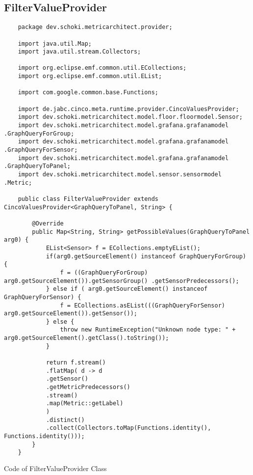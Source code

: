 \subsection{FilterValueProvider}
\begin{longlisting}
	\begin{verbatim}
	package dev.schoki.metricarchitect.provider;
	
	import java.util.Map;
	import java.util.stream.Collectors;
	
	import org.eclipse.emf.common.util.ECollections;
	import org.eclipse.emf.common.util.EList;
	
	import com.google.common.base.Functions;
	
	import de.jabc.cinco.meta.runtime.provider.CincoValuesProvider;
	import dev.schoki.metricarchitect.model.floor.floormodel.Sensor;
	import dev.schoki.metricarchitect.model.grafana.grafanamodel .GraphQueryForGroup;
	import dev.schoki.metricarchitect.model.grafana.grafanamodel .GraphQueryForSensor;
	import dev.schoki.metricarchitect.model.grafana.grafanamodel .GraphQueryToPanel;
	import dev.schoki.metricarchitect.model.sensor.sensormodel .Metric;
	
	public class FilterValueProvider extends CincoValuesProvider<GraphQueryToPanel, String> {
		
		@Override
		public Map<String, String> getPossibleValues(GraphQueryToPanel arg0) {
			EList<Sensor> f = ECollections.emptyEList();
			if(arg0.getSourceElement() instanceof GraphQueryForGroup) {
				f = ((GraphQueryForGroup) arg0.getSourceElement()).getSensorGroup() .getSensorPredecessors();
			} else if ( arg0.getSourceElement() instanceof GraphQueryForSensor) {
				f = ECollections.asEList(((GraphQueryForSensor) arg0.getSourceElement()).getSensor());
			} else {
				throw new RuntimeException("Unknown node type: " + arg0.getSourceElement().getClass().toString());
			}
			
			return f.stream()
			.flatMap( d -> d
			.getSensor()
			.getMetricPredecessors()
			.stream()
			.map(Metric::getLabel)
			)
			.distinct()
			.collect(Collectors.toMap(Functions.identity(), Functions.identity()));
		}
	}
	\end{verbatim}
	\caption{Code of FilterValueProvider Class}
	\label{lst:classFilterValueProvider}
\end{longlisting}

